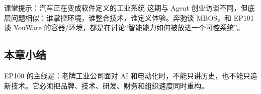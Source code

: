 \begin{knowledgebox}{课堂提示：汽车正在变成软件定义的工业系统}
这期与 Agent 创业访谈不同，但底层问题相似：谁掌控环境，谁整合技术，谁定义体验。奔驰谈 MBOS，和 EP101 谈 YouWare 的容器/环境，都是在讨论“智能能力如何被放进一个可控系统”。
\end{knowledgebox}

\subsection{本章小结}

EP100 的主线是：老牌工业公司面对 AI 和电动化时，不能只讲历史，也不能只追新技术。它必须把品牌、技术、研发、财务和组织速度同时重构。

